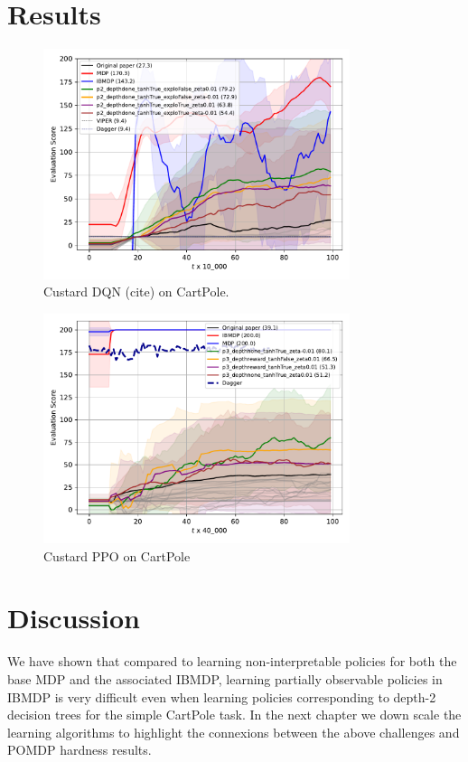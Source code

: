 \section{Results}
\begin{figure}
    \centering
    \includegraphics[width=0.8\textwidth]{images/images_part1/dqn.pdf}
    \caption{Custard DQN (cite) on CartPole.}
\end{figure}


\begin{figure}
    \centering
    \includegraphics[width=0.8\textwidth]{images/images_part1/ppo.pdf}
    \caption{Custard PPO on CartPole}
\end{figure}



\section{Discussion}
We have shown that compared to learning non-interpretable policies for both the base MDP and the associated IBMDP, learning partially observable policies in IBMDP is very difficult even when learning policies corresponding to depth-2 decision trees for the simple CartPole task.
In the next chapter we down scale the learning algorithms to highlight the connexions between the above challenges and POMDP hardness results.